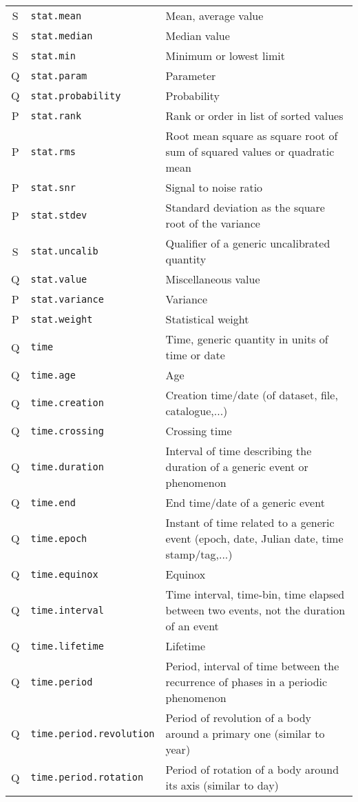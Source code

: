 \documentclass[11pt,a4paper]{ivoa}
\begin{document}
\begin{longtable}[h!]{c|p{40ex}|p{}}
S & {\tt stat.mean} & Mean, average value\\
S & {\tt stat.median} & Median value\\
S & {\tt stat.min} & Minimum or lowest limit\\
Q & {\tt stat.param} & Parameter\\
Q & {\tt stat.probability} & Probability\\
P & {\tt stat.rank} & Rank or order in list of sorted values\\
P & {\tt stat.rms} & Root mean square as square root of sum of squared values or quadratic mean\\
P & {\tt stat.snr} & Signal to noise ratio\\
P & {\tt stat.stdev} & Standard deviation as the square root of the variance\\
S & {\tt stat.uncalib} & Qualifier of a generic uncalibrated quantity\\
Q & {\tt stat.value} & Miscellaneous value\\
P & {\tt stat.variance} & Variance\\
P & {\tt stat.weight} & Statistical weight\\
Q & {\tt time} & Time, generic quantity in units of time or date\\
Q & {\tt time.age} & Age\\
Q & {\tt time.creation} & Creation time/date (of dataset, file, catalogue,...)\\
Q & {\tt time.crossing} & Crossing time\\
Q & {\tt time.duration} & Interval of time describing the duration of a generic event or phenomenon\\
Q & {\tt time.end} & End time/date of a generic event\\
Q & {\tt time.epoch} & Instant of time related to a generic event (epoch, date, Julian date, time stamp/tag,...)\\
Q & {\tt time.equinox} & Equinox\\
Q & {\tt time.interval} & Time interval, time-bin, time elapsed between two events, not the duration of an event\\
Q & {\tt time.lifetime} & Lifetime\\
Q & {\tt time.period} & Period, interval of time between the recurrence of phases in a periodic phenomenon\\
Q & {\tt time.period.revolution} & Period of revolution of a body around a primary one (similar to year)\\
Q & {\tt time.period.rotation} & Period of rotation of a body around its axis (similar to day)\\

\end{longtable}
\end{document}
